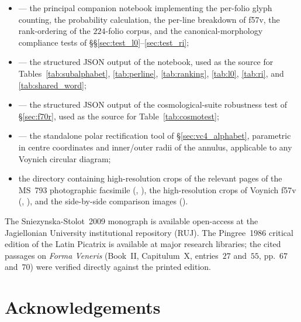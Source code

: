\begin{itemize}[itemsep=0pt,topsep=2pt]
\item {} --- the principal
companion notebook implementing the per-folio glyph counting, the
probability calculation, the per-line breakdown of f57v, the
rank-ordering of the $224$-folio corpus, and the canonical-morphology
compliance tests of \S\S\ref{sec:test_l0}--\ref{sec:test_ri};
\item {} --- the structured
JSON output of the notebook, used as the source for
Tables~\ref{tab:subalphabet}, \ref{tab:perline}, \ref{tab:ranking},
\ref{tab:l0}, \ref{tab:ri}, and \ref{tab:shared_word};
\item {} ---
the structured JSON output of the cosmological-suite robustness test
of \S\ref{sec:f70r}, used as the source for Table~\ref{tab:cosmotest};
\item {} --- the standalone
polar rectification tool of \S\ref{sec:vc4_alphabet}, parametric in
centre coordinates and inner/outer radii of the annulus, applicable to
any Voynich circular diagram;
\item the  directory containing high-resolution
crops of the relevant pages of the MS~793 photographic facsimile
(, ), the
high-resolution crops of Voynich f57v
(, ),
and the side-by-side comparison images
().
\end{itemize}

The Sniezynska-Stolot~2009 monograph is available open-access at the
Jagiellonian University institutional repository (RUJ). The Pingree~1986
critical edition of the Latin Picatrix is available at major research
libraries; the cited passages on \textit{Forma Veneris} (Book~II,
Capitulum~X, entries~$27$ and~$55$, pp.~$67$ and~$70$) were verified
directly against the printed edition.


\section*{Acknowledgements}

